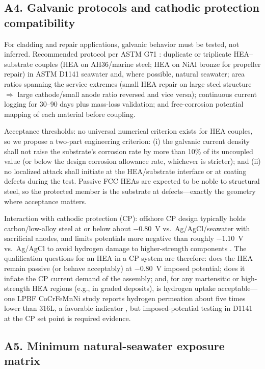 \subsection{A4. Galvanic protocols and cathodic protection compatibility}
\label{sec:a4}

For cladding and repair applications, galvanic behavior must be tested, not inferred. Recommended protocol per ASTM G71 \cite{astm_g71}: duplicate or triplicate HEA--substrate couples (HEA on AH36/marine steel; HEA on NiAl bronze for propeller repair) in ASTM D1141 seawater \cite{astm_d1141} and, where possible, natural seawater; area ratios spanning the service extremes (small HEA repair on large steel structure $\Rightarrow$ large cathode/small anode ratio reversed and vice versa); continuous current logging for 30--90 days plus mass-loss validation; and free-corrosion potential mapping of each material before coupling.

Acceptance thresholds: no universal numerical criterion exists for HEA couples, so we propose a two-part engineering criterion: (i) the galvanic current density shall not raise the substrate's corrosion rate by more than 10\% of its uncoupled value (or below the design corrosion allowance rate, whichever is stricter); and (ii) no localized attack shall initiate at the HEA/substrate interface or at coating defects during the test. Passive FCC HEAs are expected to be noble to structural steel, so the protected member is the substrate at defects---exactly the geometry where acceptance matters.

Interaction with cathodic protection (CP): offshore CP design typically holds carbon/low-alloy steel at or below about $-0.80$~V vs.\ Ag/AgCl/seawater with sacrificial anodes, and limits potentials more negative than roughly $-1.10$~V vs.\ Ag/AgCl to avoid hydrogen damage to higher-strength components \cite{dnv_rpb401}. The qualification questions for an HEA in a CP system are therefore: does the HEA remain passive (or behave acceptably) at $-0.80$~V imposed potential; does it inflate the CP current demand of the assembly; and, for any martensitic or high-strength HEA regions (e.g., in graded deposits), is hydrogen uptake acceptable---one LPBF CoCrFeMnNi study reports hydrogen permeation about five times lower than 316L, a favorable indicator \cite{lpbf_cantor_2024}, but imposed-potential testing in D1141 at the CP set point is required evidence.

\subsection{A5. Minimum natural-seawater exposure matrix}
\label{sec:a5}

